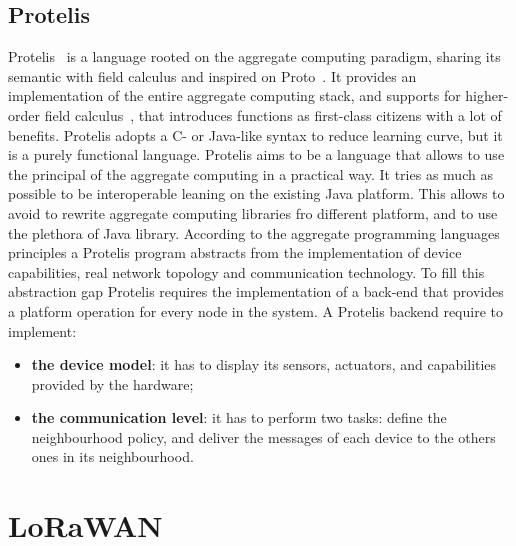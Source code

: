 \subsection{Protelis}
\label{subSec:Protelis}
Protelis~\cite{PianiniSAC2015} is a language rooted on the aggregate computing paradigm, sharing its semantic with field calculus and inspired on Proto~\cite{Proto}. %
It provides an implementation of the entire aggregate computing stack, and supports for higher-order field calculus~\cite{Audrito2019}, that introduces functions as first-class citizens with a lot of benefits.
Protelis adopts a C- or Java-like syntax to reduce learning curve, but it is a purely functional language.
% 
Protelis aims to be a language that allows to use the principal of the aggregate computing in a practical way. 
It tries as much as possible to be interoperable leaning on the existing Java platform.
This allows to avoid to rewrite aggregate computing libraries fro different platform, and to use the plethora of Java library.
According to the aggregate programming languages principles a Protelis program abstracts from the implementation of device capabilities, real network topology and communication technology. 
To fill this abstraction gap Protelis requires the implementation of a back-end that provides a platform operation for every node in the system. 
A Protelis backend require to implement:
\begin{itemize}
    \item \textbf{the device model}: it has to display its sensors, actuators, and capabilities provided by the hardware;
    \item \textbf{the communication level}: it has to perform two tasks: define the neighbourhood policy, and deliver the messages of each device to the others ones in its neighbourhood. 
\end{itemize}

\clearpage
\section{LoRaWAN}
\label{sec:LoRaWAN}


